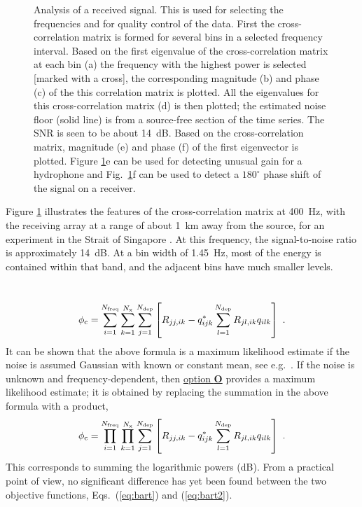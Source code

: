 \documentclass{saclantc}
\begin{document}
\begin{figure}
\centerline{}
\caption{Analysis of a received signal. This is used for selecting
 the frequencies and for quality control of the data. First the
 cross-correlation matrix is formed for several bins in a selected frequency
 interval. 
Based on the first eigenvalue of the cross-correlation matrix at each bin 
(a) the frequency with the highest power is selected [marked with a cross], 
the corresponding magnitude (b) and phase
 (c) of the this correlation matrix is plotted. 
All the eigenvalues for this
 cross-correlation matrix (d) is then plotted; the estimated noise floor (solid line) is from
 a source-free section of the time series. The SNR is seen to be about 14~dB. 
 Based on the cross-correlation matrix, magnitude (e) and phase (f) of the
 first eigenvector is plotted. 
Figure \ref{covplot}e can be used for detecting unusual gain for a hydrophone and
 Fig.\ \ref{covplot}f can be used to detect a $180^\circ$ phase shift of the signal on a receiver.}
\label{covplot}
\end{figure}

Figure \ref{covplot} illustrates the features of the cross-correlation matrix
at 400~Hz, with the receiving array at a range of about 1~km away 
from the source, for an experiment in the Strait of Singapore \cite{purnima98e}. 
At this frequency, the signal-to-noise ratio is
approximately 14~dB.  At a bin width of 1.45~Hz, most of the energy is
contained within that band, and the adjacent bins have much smaller
levels.

\
 \begin{equation}
\phi_{\rm c}=
 \sum^{N _{\rm freq}}_{i=1} 
 \sum^{N _{\rm x   }}_{k=1}
 \sum^{N _{\rm dep }}_{j=1}
\left[
R_{jj,ik}-      q_{ijk}^* 
 \sum^{N _{\rm dep }}_{l=1} R_{jl,ik} q_{ilk} \right]~.
 \label{eq:bart}
\end{equation}
It can be shown that the above formula is a maximum likelihood
estimate if the noise is assumed Gaussian with known or constant
mean, see e.g.\ \cite{gerstoft:asa98}. If the noise is unknown and
frequency-dependent, then 
 \underline{option {\bf O}} provides a maximum likelihood
estimate; it is obtained by replacing the summation in the above formula with a
product, 
\begin{equation}
\phi_{\rm c}=
\prod^{N_{\rm freq}}_{i=1} 
\prod^{N_{\rm    x}}_{k=1}
\sum^ {N_{\rm dep }}_{j=1}
\left[
R_{jj,ik}-      q_{ijk}^* \sum^{N _{\rm dep}}_{l=1} R_{jl,ik} q_{ilk} \right]~.
\label{eq:bart2}
\end{equation}
This corresponds to summing the logarithmic powers (dB). From a
practical point of view, no significant difference has yet been
found between the two objective functions, Eqs.\ (\ref{eq:bart}) and 
 (\ref{eq:bart2}).
\end{document}
